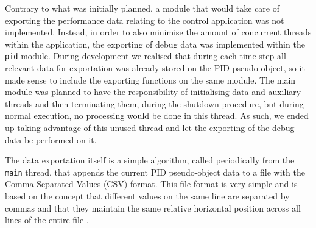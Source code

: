 Contrary to what was initially planned, a module that would take care of exporting the performance data relating to the control application was not implemented.
Instead, in order to also minimise the amount of concurrent threads within the application, the exporting of debug data was implemented within the \verb|pid| module.
During development we realised that during each time-step all relevant data for exportation was already stored on the PID pseudo-object, so it made sense to include the exporting functions on the same module.
The main module was planned to have the responsibility of initialising data and auxiliary threads and then terminating them, during the shutdown procedure, but during normal execution, no processing would be done in this thread.
As such, we ended up taking advantage of this unused thread and let the exporting of the debug data be performed on it.

The data exportation itself is a simple algorithm, called periodically from the \verb|main| thread, that appends the current PID pseudo-object data to a file with the Comma-Separated Values (CSV) format.
This file format is very simple and is based on the concept that different values on the same line are separated by commas and that they maintain the same relative horizontal position across all lines of the entire file \cite{sw:csv}.
